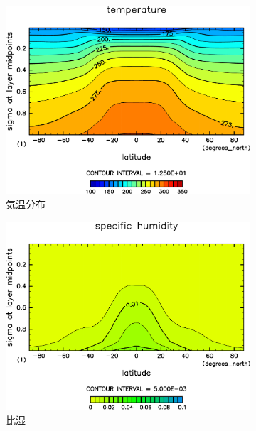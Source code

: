 \documentclass[body]{subfiles}
\begin{document}
\begin{figure}[t]
\begin{subfigure}{.4\textwidth}
		\includegraphics[width=\columnwidth]{S1500/Temp,time=3650:4015-crop-rotate.pdf}
		\caption{気温分布}
	\end{subfigure}
	\begin{subfigure}{.4\textwidth}
		\centering
		\includegraphics[width=\columnwidth]{S1500/QH2OVap,time=3650:4015-crop-rotate.pdf}
		\caption{比湿}
	\end{subfigure}
	\begin{subfigure}{.4\textwidth}
		\centering

\end{subfigure}
\end{figure}
\end{document}
